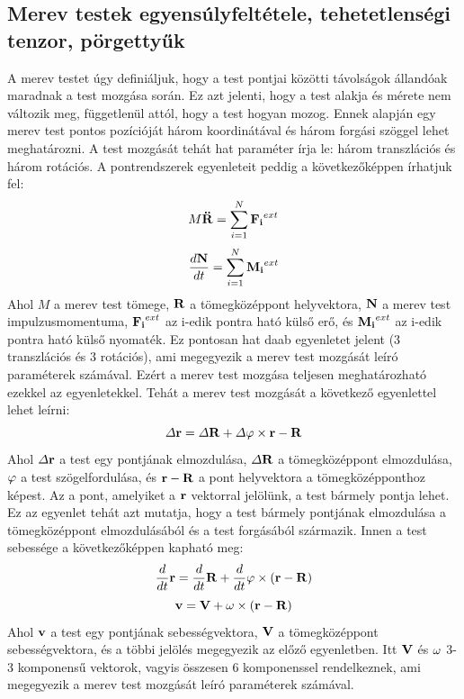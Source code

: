 \documentclass[a4paper,12pt]{article}
\begin{document}
\subsection{Merev testek egyensúlyfeltétele, tehetetlenségi tenzor, pörgettyűk}
A merev testet úgy definiáljuk, hogy a test pontjai közötti távolságok állandóak maradnak a test mozgása során. Ez azt jelenti, hogy a test alakja és mérete nem változik meg, függetlenül attól, hogy a test hogyan mozog.
Ennek alapján egy merev test pontos pozícióját három koordinátával és három forgási szöggel lehet meghatározni. A test mozgását tehát hat paraméter írja le: három transzlációs és három rotációs.
A pontrendszerek egyenleteit peddig a következőképpen írhatjuk fel:
\begin{equation}
    M \bold{\ddot{R}} = \sum_{i=1}^{N} \bold{F_i}^{ext}
\end{equation}
\begin{equation}
    \frac{d\bold{N}}{dt} = \sum_{i=1}^{N} \bold{M_i}^{ext}
\end{equation}
Ahol $M$ a merev test tömege, $\bold{R}$ a tömegközéppont helyvektora, $\bold{N}$ a merev test impulzusmomentuma, $\bold{F_i}^{ext}$ az i-edik pontra ható külső erő, és $\bold{M_i}^{ext}$ az i-edik pontra ható külső nyomaték.
Ez pontosan hat daab egyenletet jelent (3 transzlációs és 3 rotációs), ami megegyezik a merev test mozgását leíró paraméterek számával. Ezért a merev test mozgása teljesen meghatározható ezekkel az egyenletekkel.
Tehát a merev test mozgását a következő egyenlettel lehet leírni:
\begin{equation}
    \varDelta \bold{r} = \varDelta \bold{R} + \varDelta \bold{\varphi} \times \bold{\bold{r} - \bold{R}}
\end{equation}
Ahol $\varDelta \bold{r}$ a test egy pontjának elmozdulása, $\varDelta \bold{R}$ a tömegközéppont elmozdulása, $\bold{\varphi}$ a test szögelfordulása, és $\bold{r} - \bold{R}$ a pont helyvektora a tömegközépponthoz képest.
Az a pont, amelyiket a $\bold{r}$ vektorral jelölünk, a test bármely pontja lehet. Ez az egyenlet tehát azt mutatja, hogy a test bármely pontjának elmozdulása a tömegközéppont elmozdulásából és a test forgásából származik. 
Innen a test sebessége a következőképpen kapható meg:
\begin{equation}
    \frac{d}{dt}\bold{r} = \frac{d}{dt}\bold{R} + \frac{d}{dt}\bold{\varphi} \times (\bold{r} - \bold{R})
\end{equation}
\begin{equation}
    \bold{v} = \bold{V} + \bold{\omega} \times (\bold{r} - \bold{R})
\end{equation}
Ahol $\bold{v}$ a test egy pontjának sebességvektora, $\bold{V}$ a tömegközéppont sebességvektora, és a többi jelölés megegyezik az előző egyenletben. Itt $\bold{V}$ és $\bold{\omega}$ 3-3 komponensű vektorok, vagyis összesen 6 komponenssel rendelkeznek, ami megegyezik a merev test mozgását leíró paraméterek számával. 
\end{document}
